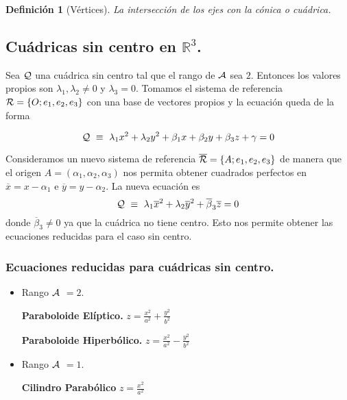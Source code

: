 \documentclass[11pt, a4paper, titlepage]{article}
\theoremstyle{theorem-style}
\theoremstyle{definition-style}
\newtheorem*{ndef}{Definición}
\theoremstyle{remark-style}
\theoremstyle{example-style}
\begin{document}
\begin{ndef}[Vértices]
	La intersecci\'on de los ejes con la c\'onica o cu\'adrica.
\end{ndef}


\subsection{\bf Cu\'adricas sin centro en $\mathbb{R}^3$.}


Sea $\cal Q$ una cu\'adrica sin centro tal que el rango de $\cal A$ sea $2$. Entonces los valores propios son 
$\lambda_1,\lambda_2 \neq 0$ y $\lambda_3=0$. Tomamos el sistema de referencia ${\cal R} = \{O; e_1,e_2,e_3\}$ con una base de vectores propios y la ecuaci\'on queda de la forma 

\vspace{.3cm}

\[
{\cal Q} \, \, \equiv \, \, \lambda_1 x^2 + \lambda_2 y^2 + \beta_1 x + \beta_2 y + \beta_3 z + \gamma = 0
\]  

\vspace{.2cm}

Consideramos un nuevo sistema de referencia $\overline{{\cal R}} = \{A;e_1,e_2,e_3\}$ de manera que el origen 
$A=(\alpha_1,\alpha_2,\alpha_3)$ nos permita obtener cuadrados perfectos en $\overline{x}=x-\alpha_1$ e 
$\overline{y}=y-\alpha_2$. La nueva ecuaci\'on es
\[
{\cal Q} \, \, \equiv \, \, \lambda_1 \overline{x}^2 + \lambda_2 \overline{y}^2 + 
\overline{\beta}_3 \overline{z} = 0
\]
donde $\overline{\beta}_3\neq 0$ ya que la cu\'adrica no tiene centro. Esto nos permite obtener las ecuaciones reducidas para el caso sin centro.


\subsubsection{\bf Ecuaciones reducidas para cu\'adricas sin centro.}

\begin{itemize}

\item {Rango $\cal A$ $=2$.}



{\bf Paraboloide El\'iptico.}    \hspace{2.7cm}   $z = \frac{x^2}{a^2} + \frac{y^2}{b^2}$

\vspace{.2cm}

{\bf Paraboloide Hiperb\'olico.}    \hspace{2cm}   $z = \frac{x^2}{a^2} - \frac{y^2}{b^2}$

\vspace{0.5cm}

\item {Rango $\cal A$ $=1$.}


{\bf Cilindro Parab\'olico}    \hspace{3.3cm}   $z = \frac{x^2}{a^2}$ 

\end{itemize}
\end{document}
